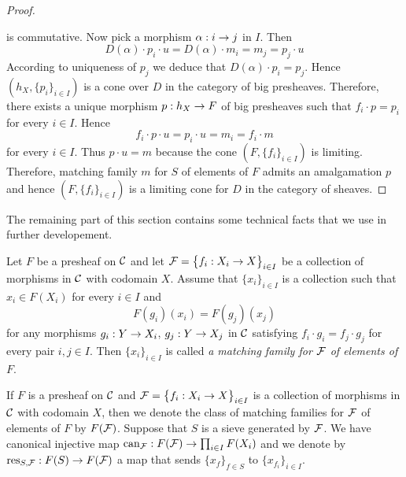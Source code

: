 \begin{proof}
\begin{center}
\end{center}
is commutative. Now pick a morphism $\alpha:i\rightarrow j$ in $I$. Then 
$$D(\alpha)\cdot p_i\cdot u = D(\alpha)\cdot m_i = m_j = p_j\cdot u$$
According to uniqueness of $p_j$ we deduce that $D(\alpha)\cdot p_i = p_j$. Hence $\left(h_X,\big\{p_i\big\}_{i\in I}\right)$ is a cone over $D$ in the category of big presheaves. Therefore, there exists a unique morphism $p:h_X\rightarrow F$ of big presheaves such that $f_i\cdot p = p_i$ for every $i\in I$. Hence 
$$f_i\cdot p\cdot u=p_i\cdot u= m_i = f_i\cdot m$$
for every $i\in I$. Thus $p\cdot u = m$ because the cone $\left(F,\big\{f_i\big\}_{i\in I}\right)$ is limiting. Therefore, matching family $m$ for $S$ of elements of $F$ admits an amalgamation $p$ and hence $\left(F,\big\{f_i\big\}_{i\in I}\right)$ is a limiting cone for $D$ in the category of sheaves. 
\end{proof}
\noindent
The remaining part of this section contains some technical facts that we use in further developement.

\begin{definition}
Let $F$ be a presheaf on ${\mathcal C}$ and let ${\mathcal F} = \big\{f_i:X_i\rightarrow X\big\}_{i\in I}$ be a collection of morphisms in ${\mathcal C}$ with codomain $X$. Assume that $\{x_i\}_{i\in I}$ is a collection such that $x_i\in F(X_i)$ for every $i\in I$ and
$$F(g_i)(x_i) = F(g_j)(x_j)$$
for any morphisms $g_i:Y\rightarrow X_i$, $g_j:Y\rightarrow X_j$ in ${\mathcal C}$ satisfying $f_i\cdot g_i = f_j\cdot g_j$ for every pair $i,j\in I$. Then $\{x_i\}_{i\in I}$ is called \textit{a matching family for ${\mathcal F}$ of elements of $F$}.
\end{definition}
\noindent
If $F$ is a presheaf on ${\mathcal C}$ and ${\mathcal F} = \big\{f_i:X_i\rightarrow X\big\}_{i\in I}$ is a collection of morphisms in ${\mathcal C}$ with codomain $X$, then we denote the class of matching families for ${\mathcal F}$ of elements of $F$ by $F({\mathcal F})$. Suppose that $S$ is a sieve generated by ${\mathcal F}$. We have canonical injective map $\mathrm{can}_{{\mathcal F}}:F({\mathcal F})\rightarrow \prod_{i\in I}F(X_i)$ and we denote by $\mathrm{res}_{S,{\mathcal F}}:F(S)\rightarrow F({\mathcal F})$ a map that sends $\{x_f\}_{f\in S}$ to $\{x_{f_i}\}_{i\in I}$.

